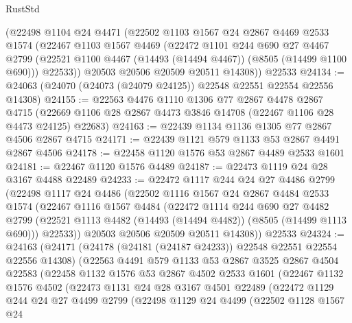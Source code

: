 \begin{lexlean}{RustStd}
\begin{coremodule}
    (@22498
      @1104
      @24
      @4471
      (@22502
        @1103
        @1567
        @24
        @2867
        @4469
        @2533
        @1574
        (@22467
          @1103
          @1567
          @4469
          (@22472
            @1101
            @244
            @690
            @27
            @4467
            @2799
            (@22521 @1100 @4467 (@14493 (@14494 @4467)) (@8505 (@14499 @1100 @690)))
            @22533))
        @20503
        @20506
        @20509
        @20511
        @14308))
    @22533
@24134 := @24063 (@24070 (@24073 (@24079 @24125)) @22548 @22551 @22554 @22556 @14308)
@24155 := @22563
    @4476
    @1110
    @1306
    @77
    @2867
    @4478
    @2867
    @4715
    (@22669 @1106 @28 @2867 @4473 @3846 @14708 (@22467 @1106 @28 @4473 @24125) @22683)
@24163 := @22439 @1134 @1136 @1305 @77 @2867 @4506 @2867 @4715
@24171 := @22439 @1121 @579 @1133 @53 @2867 @4491 @2867 @4506
@24178 := @22458 @1120 @1576 @53 @2867 @4489 @2533 @1601
@24181 := @22467 @1120 @1576 @4489
@24187 := @22473 @1119 @24 @28 @3167 @4488 @22489
@24233 := @22472
    @1117
    @244
    @24
    @27
    @4486
    @2799
    (@22498
      @1117
      @24
      @4486
      (@22502
        @1116
        @1567
        @24
        @2867
        @4484
        @2533
        @1574
        (@22467
          @1116
          @1567
          @4484
          (@22472
            @1114
            @244
            @690
            @27
            @4482
            @2799
            (@22521 @1113 @4482 (@14493 (@14494 @4482)) (@8505 (@14499 @1113 @690)))
            @22533))
        @20503
        @20506
        @20509
        @20511
        @14308))
    @22533
@24324 := @24163
    (@24171
      (@24178 (@24181 (@24187 @24233)) @22548 @22551 @22554 @22556 @14308)
      (@22563
        @4491
        @579
        @1133
        @53
        @2867
        @3525
        @2867
        @4504
        @22583
        (@22458
          @1132
          @1576
          @53
          @2867
          @4502
          @2533
          @1601
          (@22467
            @1132
            @1576
            @4502
            (@22473
              @1131
              @24
              @28
              @3167
              @4501
              @22489
              (@22472
                @1129
                @244
                @24
                @27
                @4499
                @2799
                (@22498
                  @1129
                  @24
                  @4499
                  (@22502
                    @1128
                    @1567
                    @24

\end{coremodule}
\end{lexlean}
